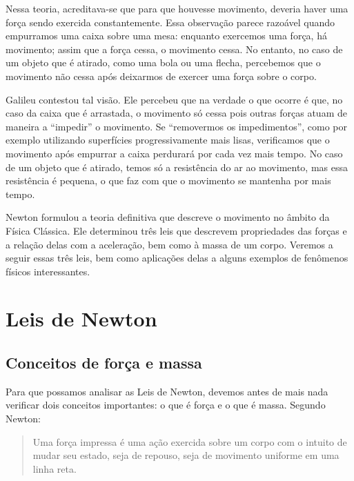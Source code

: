 Nessa teoria, acreditava-se que para que houvesse movimento, deveria haver uma força sendo exercida constantemente. Essa observação parece razoável quando empurramos uma caixa sobre uma mesa: enquanto exercemos uma força, há movimento; assim que a força cessa, o movimento cessa. No entanto, no caso de um objeto que é atirado, como uma bola ou uma flecha, percebemos que o movimento não cessa após deixarmos de exercer uma força sobre o corpo.

Galileu contestou tal visão. Ele percebeu que na verdade o que ocorre é que, no caso da caixa que é arrastada, o movimento só cessa pois outras forças atuam de maneira a ``impedir'' o movimento. Se ``removermos os impedimentos'', como por exemplo utilizando superfícies progressivamente mais lisas, verificamos que o movimento após empurrar a caixa perdurará por cada vez mais tempo. No caso de um objeto que é atirado, temos só a resistência do ar ao movimento, mas essa resistência é pequena, o que faz com que o movimento se mantenha por mais tempo.

Newton formulou a teoria definitiva que descreve o movimento no âmbito da Física Clássica. Ele determinou três leis que descrevem propriedades das forças e a relação delas com a aceleração, bem como à massa de um corpo. Veremos a seguir essas três leis, bem como aplicações delas a alguns exemplos de fenômenos físicos interessantes.

\section{Leis de Newton}


\subsection{Conceitos de força e massa}
\label{Sec:ConceitosDeMassaEForca}

Para que possamos analisar as Leis de Newton, devemos antes de mais nada verificar dois conceitos importantes: o que é força e o que é massa. Segundo Newton:

\begin{quote}
    Uma força impressa é uma ação exercida sobre um corpo com o intuito de mudar seu estado, seja de repouso, seja de movimento uniforme em uma linha reta.
\end{quote}

